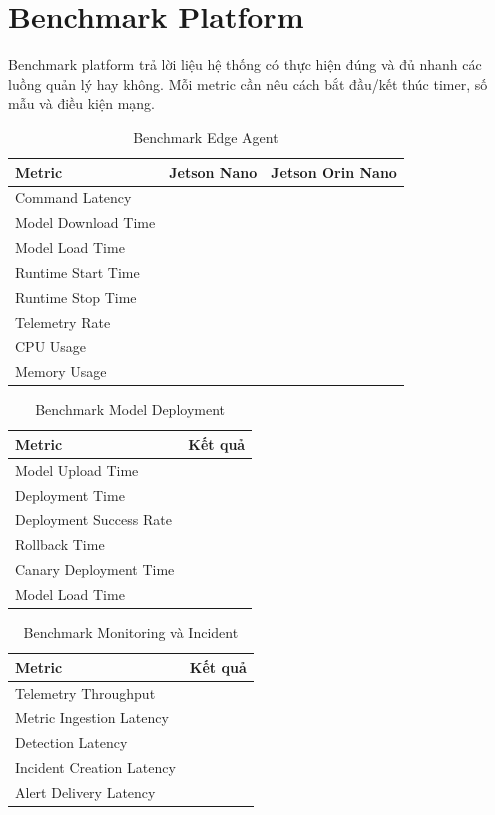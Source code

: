 \section{Benchmark Platform}

Benchmark platform trả lời liệu hệ thống có thực hiện đúng và đủ nhanh các luồng
quản lý hay không. Mỗi metric cần nêu cách bắt đầu/kết thúc timer, số mẫu và điều
kiện mạng.

\begin{table}[H]
\centering
\caption{Benchmark Edge Agent}
\label{tab:edge-agent-benchmark}
\begin{tabularx}{\textwidth}{L{6cm}YY}
\toprule
\textbf{Metric} & \textbf{Jetson Nano} & \textbf{Jetson Orin Nano}\\
\midrule
Command Latency & \cbs{} & \cbs{}\\
Model Download Time & \cbs{} & \cbs{}\\
Model Load Time & \cbs{} & \cbs{}\\
Runtime Start Time & \cbs{} & \cbs{}\\
Runtime Stop Time & \cbs{} & \cbs{}\\
Telemetry Rate & \cbs{} & \cbs{}\\
CPU Usage & \cbs{} & \cbs{}\\
Memory Usage & \cbs{} & \cbs{}\\
\bottomrule
\end{tabularx}
\end{table}

\begin{table}[H]
\centering
\caption{Benchmark Model Deployment}
\label{tab:deployment-benchmark}
\begin{tabularx}{\textwidth}{L{8cm}Y}
\toprule
\textbf{Metric} & \textbf{Kết quả}\\
\midrule
Model Upload Time & \cbs{}\\
Deployment Time & \cbs{}\\
Deployment Success Rate & \cbs{}\\
Rollback Time & \cbs{}\\
Canary Deployment Time & \cbs{}\\
Model Load Time & \cbs{}\\
\bottomrule
\end{tabularx}
\end{table}

\begin{table}[H]
\centering
\caption{Benchmark Monitoring và Incident}
\label{tab:monitoring-benchmark}
\begin{tabularx}{\textwidth}{L{8cm}Y}
\toprule
\textbf{Metric} & \textbf{Kết quả}\\
\midrule
Telemetry Throughput & \cbs{}\\
Metric Ingestion Latency & \cbs{}\\
Detection Latency & \cbs{}\\
Incident Creation Latency & \cbs{}\\
Alert Delivery Latency & \cbs{}\\
\bottomrule
\end{tabularx}
\end{table}

